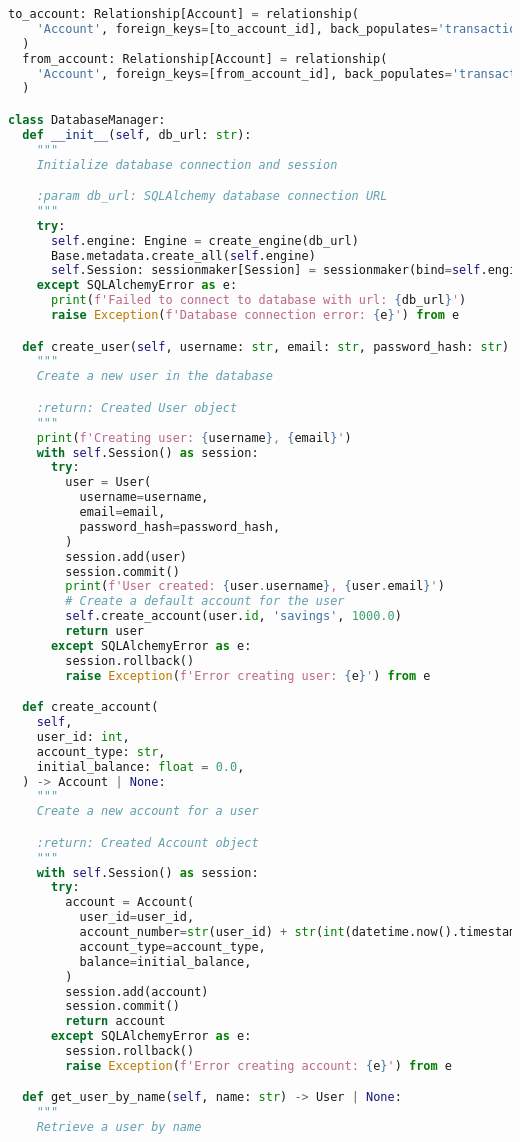 \begin{lstlisting}[language=Python]
  to_account: Relationship[Account] = relationship(
    'Account', foreign_keys=[to_account_id], back_populates='transactions'
  )
  from_account: Relationship[Account] = relationship(
    'Account', foreign_keys=[from_account_id], back_populates='transactions_from'
  )

class DatabaseManager:
  def __init__(self, db_url: str):
    """
    Initialize database connection and session

    :param db_url: SQLAlchemy database connection URL
    """
    try:
      self.engine: Engine = create_engine(db_url)
      Base.metadata.create_all(self.engine)
      self.Session: sessionmaker[Session] = sessionmaker(bind=self.engine)
    except SQLAlchemyError as e:
      print(f'Failed to connect to database with url: {db_url}')
      raise Exception(f'Database connection error: {e}') from e

  def create_user(self, username: str, email: str, password_hash: str) -> User | None:
    """
    Create a new user in the database

    :return: Created User object
    """
    print(f'Creating user: {username}, {email}')
    with self.Session() as session:
      try:
        user = User(
          username=username,
          email=email,
          password_hash=password_hash,
        )
        session.add(user)
        session.commit()
        print(f'User created: {user.username}, {user.email}')
        # Create a default account for the user
        self.create_account(user.id, 'savings', 1000.0)
        return user
      except SQLAlchemyError as e:
        session.rollback()
        raise Exception(f'Error creating user: {e}') from e

  def create_account(
    self,
    user_id: int,
    account_type: str,
    initial_balance: float = 0.0,
  ) -> Account | None:
    """
    Create a new account for a user

    :return: Created Account object
    """
    with self.Session() as session:
      try:
        account = Account(
          user_id=user_id,
          account_number=str(user_id) + str(int(datetime.now().timestamp())),
          account_type=account_type,
          balance=initial_balance,
        )
        session.add(account)
        session.commit()
        return account
      except SQLAlchemyError as e:
        session.rollback()
        raise Exception(f'Error creating account: {e}') from e

  def get_user_by_name(self, name: str) -> User | None:
    """
    Retrieve a user by name


\end{lstlisting}
